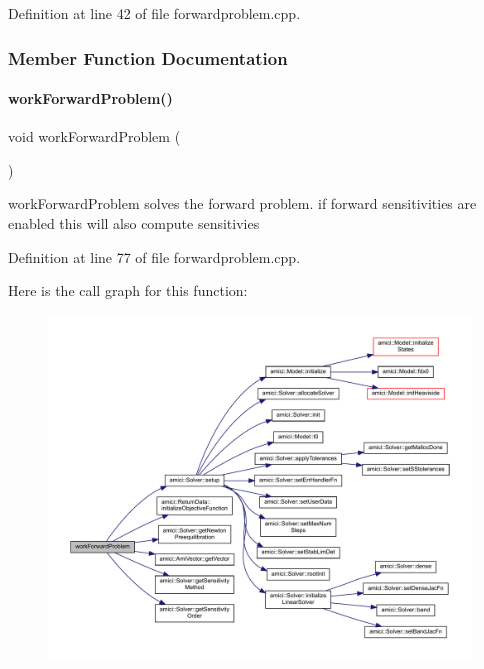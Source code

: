 Definition at line 42 of file forwardproblem.\+cpp.



\subsubsection{Member Function Documentation}
\mbox{\label{classamici_1_1_forward_problem_a4ef001eef23bc48270159d6193036858}} 
\paragraph{\texorpdfstring{work\+Forward\+Problem()}{workForwardProblem()}}
{\footnotesize\ttfamily void work\+Forward\+Problem (\begin{DoxyParamCaption}{ }\end{DoxyParamCaption})}

work\+Forward\+Problem solves the forward problem. if forward sensitivities are enabled this will also compute sensitivies

Definition at line 77 of file forwardproblem.\+cpp.

Here is the call graph for this function\+:
\nopagebreak
\begin{figure}[H]
\begin{center}
\leavevmode
\includegraphics[width=350pt]{classamici_1_1_forward_problem_a4ef001eef23bc48270159d6193036858_cgraph}
\end{center}
\end{figure}
\mbox{\label{classamici_1_1_forward_problem_a1bc77462943aa0bae032ffa5d6e887ee}} 
